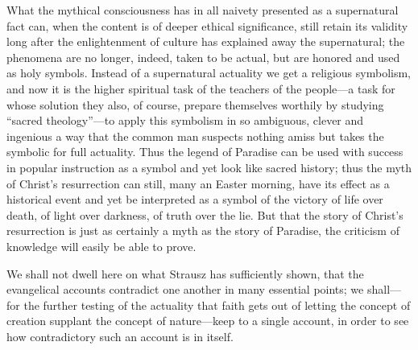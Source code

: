 \documentclass[12pt]{book}
\newcommand{\opage}[1]{\marginnote{\footnotesize\textit{[#1]}}}
\begin{document}
What the mythical consciousness has in all naivety presented as a
supernatural fact can, when the content is of deeper ethical
significance, still retain its validity long after the enlightenment of
culture has explained away the supernatural; the phenomena are no
longer, indeed, taken to be actual, but are honored and used as holy
symbols. Instead of a supernatural actuality we get a religious
symbolism, and now it is the higher spiritual task of the teachers of
the people---a task for whose solution they also, of course, prepare
themselves worthily by studying ``sacred theology''---to apply this
symbolism in so ambiguous, clever and ingenious a way that the common
man suspects nothing amiss but takes the symbolic for full actuality.
Thus the legend of
\opage{164}\setcounter{footnote}{0}%
Paradise can be used with success in popular instruction as a symbol and
yet look like sacred history; thus the myth of Christ's resurrection can
still, many an Easter morning, have its effect as a historical event and
yet be interpreted as a symbol of the victory of life over death, of
light over darkness, of truth over the lie. But that the story of
Christ's resurrection is just as certainly a myth as the story of
Paradise, the criticism of knowledge will easily be able to prove.

We shall not dwell here on what Strausz has sufficiently shown, that
the evangelical accounts contradict one another in many essential
points; we shall---for the further testing of the actuality that faith
gets out of letting the concept of creation supplant the concept of
nature---keep to a single account, in order to see how contradictory
such an account is in itself.
\end{document}

